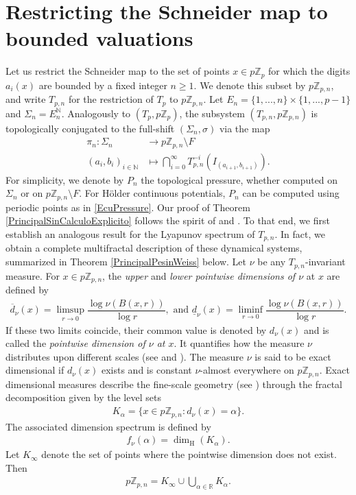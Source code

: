 \documentclass[11pt]{amsart}
\theoremstyle{remark}
\numberwithin{equation}{section}
\newcommand{\N}{\mathbb{N}}
\newcommand{\R}{\mathbb{R}}
\newcommand{\Z}{\mathbb{Z}}
\newcommand{\Zp}{\mathbb{Z}_p}
\begin{document}
\section{Restricting the Schneider map to bounded valuations}

\noindent Let us restrict the Schneider map to the set of points $x\in p\Zp$ for which the digits $a_i(x)$ are bounded by a fixed integer $n\geq 1$. 
We denote this subset by $p\Z_{p,n}$, and write $T_{p,n}$ for the restriction of $T_{p}$ to $p\Z_{p,n}$. Let $E_{n}=\{1,...,n\}\times \{1,...,p-1\}$ and $\Sigma_{n}=E_{n}^{\mathbb{N}}$. Analogously to $(T_{p},p\Zp)$, the subsystem $(T_{p,n},p\Z_{p,n})$ is topologically conjugated to the full-shift $(\Sigma_{n},\sigma)$ via the map
\begin{align*}
    \pi_{n}:\Sigma_{n}&\longrightarrow p\Z_{p,n}\setminus F\\
    (a_{i},b_{i})_{i\in \N}&\longmapsto \bigcap_{i=0}^{\infty}T_{p,n}^{-i}\left(I_{(a_{i+1},b_{i+1})}\right).
\end{align*}
For simplicity, we denote by $P_{n}$ the topological pressure, whether computed on $\Sigma_{n}$ or on $p\Z_{p,n}\setminus F$. For H\"older continuous potentials, $P_{n}$ can be computed using periodic points as in \eqref{EcuPressure}. Our proof of Theorem \ref{PrincipalSinCalculoExplicito} follows the spirit of \cite[Theorem 4.1]{io} and \cite[Theorem 5.1]{an}. To that end, we first establish an analogous result for the Lyapunov spectrum of $T_{p,n}$. In fact, we obtain a complete multifractal description of these dynamical systems, summarized in Theorem \ref{PrincipalPesinWeiss} below. Let $\nu$ be any $T_{p,n}$-invariant measure. For $x\in p\Z_{p,n}$, the \textit{upper} and \textit{lower pointwise dimensions of $\nu$} at $x$ are defined by
    \begin{align*}
        \overline{d}_{\nu}(x)=\limsup_{r\rightarrow 0}\dfrac{\log \nu(B(x,r))}{\log r}, \text{ and }\underline{d}_{\nu}(x)=\liminf_{r\rightarrow 0}\dfrac{\log \nu(B(x,r))}{\log r}.
    \end{align*}If these two limits coincide, their common value is denoted by $d_{\nu}(x)$ and is called the \textit{pointwise dimension of $\nu$ at $x$}. It quantifies how the measure $\nu$ distributes upon different scales (see \cite[Chapter 17]{fa} and \cite{yh2}). The measure $\nu$ is said to be exact dimensional if $d_{\nu}(x)$ exists and is constant $\nu$-almost everywhere on $p\Z_{p,n}$. Exact dimensional measures describe the fine-scale geometry (see \cite{yh2}) through the fractal decomposition given by the level sets 
\begin{align*}
    K_{\alpha}=\{x\in p\Z_{p,n}: d_{\nu}(x)=\alpha\}.
\end{align*} The associated dimension spectrum is defined by
\begin{align}
    f_{\nu}(\alpha)=\dim_{\mathrm{H}}(K_{\alpha}).
\end{align} Let $K_{\infty}$ denote the set of points where the pointwise dimension does not exist. Then
\begin{align*}
    p\Z_{p,n}=K_{\infty}\cup \bigcup_{\alpha \in \R}K_{\alpha}.
\end{align*}
\end{document}

